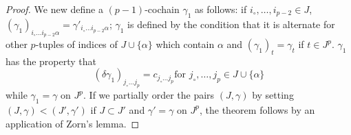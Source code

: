 \begin{proof}
We new define a $(p-1)$-cochain $\gamma_1$ as follows: if $i_\circ,
\ldots, i_{p-2} \in  J$, $(\gamma_1)_{i_\circ \ldots i_{p-2} \alpha} =
\gamma'_{i_\circ \ldots i_{p-2} \alpha}$; $\gamma_1$ is defined by the
condition that it is alternate for other $p$-tuples of indices of $J
\cup \{\alpha\}$ which contain $\alpha$ and $(\gamma_1)_t = \gamma_t$
if $t \in J^p$. $\gamma_1$ has the property that 
$$
(\delta \gamma_1)_{j_\circ \ldots j_p} = c_{j_\circ \ldots j_p} \text{
for } j_\circ, \ldots, j_p \in J \cup \{\alpha\}
$$
while $\gamma_1 = \gamma$ on $J^p$. If we partially order the pairs
$(J, \gamma)$ by setting $(J, \gamma) < (J', \gamma')$ if $J \subset J'$
and $\gamma' = \gamma$ on $J^p$, the theorem follows by an application
of Zorn's lemma.
\end{proof}

